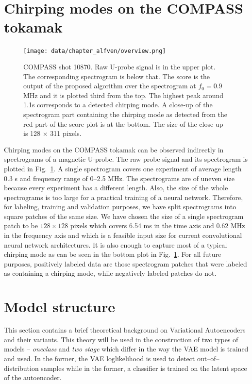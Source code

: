 \section{Chirping modes on the COMPASS tokamak}
\begin{figure}[t]%
  \centering
  \texttt{[image: data/chapter\_alfven/overview.png]}
  \caption{COMPASS shot 10870. Raw U-probe signal is in the upper plot. The corresponding spectrogram is below that. The score is the output of the proposed algorithm over the spectrogram at $f_0=0.9$ MHz and it is plotted third from the top. The highest peak around 1.1s corresponds to a detected chirping mode. A close-up of the spectrogram part containing the chirping mode as detected from the red part of the score plot is at the bottom. The size of the close-up is 128 $\times$ 311 pixels.}
  \label{fig:psd}
\end{figure}

Chirping modes on the COMPASS tokamak can be observed indirectly in spectrograms of a magnetic U-probe\cite{kovavrik2011u}. The raw probe signal and its spectrogram is plotted in Fig.~\ref{fig:psd}. A single spectrogram covers one experiment of average length 0.3 s and frequency range of 0--2.5 MHz. The spectrograms are of uneven size because every experiment has a different length. Also, the size of the whole spectrograms is too large for a practical training of a neural network. Therefore, for labeling, training and validation purposes, we have split spectrograms into square patches of the same size. We have chosen the size of a single spectrogram patch to be $128 \times 128$ pixels which covers 6.54 ms in the time axis and 0.62 MHz in the frequency axis and which is a feasible input size for current convolutional neural network architectures. It is also enough to capture most of a typical chirping mode as can be seen in the bottom plot in Fig.~\ref{fig:psd}. For all future purposes, positively labeled data are those spectrogram patches that were labeled as containing a chirping mode, while negatively labeled patches do not.

\section{Model structure}
 This section contains a brief theoretical background on Variational Autoencoders and their variants. This theory will be used in the construction of two types of models -- \textit{oneclass} and \textit{two stage} which differ in the way the VAE model is trained and used. In the former, the VAE loglikelihood is used to detect out--of--distribution samples while in the former, a classifier is trained on the latent space of the autoencoder.

